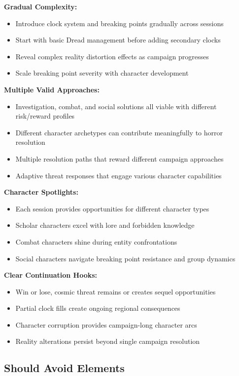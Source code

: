 \documentclass[11pt]{article}
\begin{document}
\textbf{Gradual Complexity:}
\begin{itemize}
\item Introduce clock system and breaking points gradually across sessions
\item Start with basic Dread management before adding secondary clocks
\item Reveal complex reality distortion effects as campaign progresses
\item Scale breaking point severity with character development
\end{itemize}

\textbf{Multiple Valid Approaches:}
\begin{itemize}
\item Investigation, combat, and social solutions all viable with different risk/reward profiles
\item Different character archetypes can contribute meaningfully to horror resolution
\item Multiple resolution paths that reward different campaign approaches
\item Adaptive threat responses that engage various character capabilities
\end{itemize}

\textbf{Character Spotlights:}
\begin{itemize}
\item Each session provides opportunities for different character types
\item Scholar characters excel with lore and forbidden knowledge
\item Combat characters shine during entity confrontations
\item Social characters navigate breaking point resistance and group dynamics
\end{itemize}

\textbf{Clear Continuation Hooks:}
\begin{itemize}
\item Win or lose, cosmic threat remains or creates sequel opportunities
\item Partial clock fills create ongoing regional consequences
\item Character corruption provides campaign-long character arcs
\item Reality alterations persist beyond single campaign resolution
\end{itemize}

\subsection{Should Avoid Elements}
\end{document}
